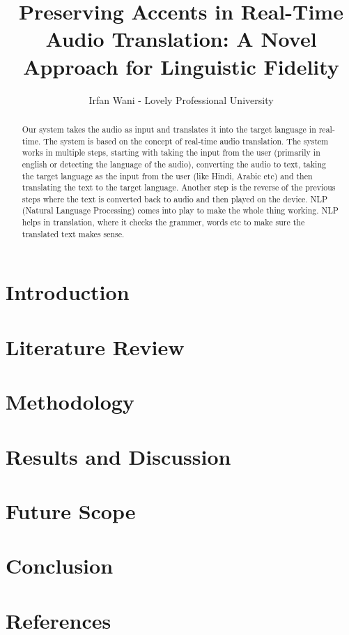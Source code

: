 \documentclass[12pt, a4paper]{article}
\title{Preserving Accents in Real-Time Audio Translation: A Novel Approach for Linguistic Fidelity}
\author{Irfan Wani - Lovely Professional University}
\begin{document}
    
\maketitle
    \begin{abstract}
    Our system takes the audio as input and translates it into the target language in real-time. The system is based on the concept of real-time audio translation. The system works in multiple steps, starting with taking the input from the user (primarily in english or detecting the language of the audio), converting the audio to text, taking the target language as the input from the user (like Hindi, Arabic etc) and then translating the text to the target language. Another step is the reverse of the previous steps where the text is converted back to audio and then played on the device.  NLP (Natural Language Processing) comes into play to make the whole thing working. NLP helps in translation, where it checks the grammer, words etc to make sure the translated text makes sense.
    \end{abstract}
\section{Introduction}
\section{Literature Review}
\section{Methodology}
\section{Results and Discussion}
\section{Future Scope}
\section{Conclusion}
\section{References}
\end{document}
